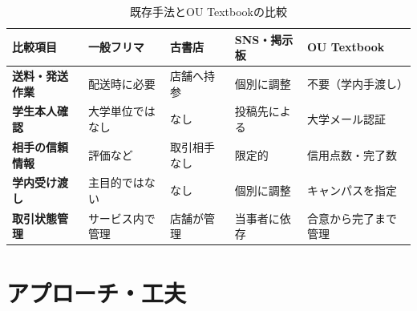 \documentclass[11pt,a4paper]{article}
\begin{document}
\begin{table}[htbp]
  \centering
  \caption{既存手法とOU Textbookの比較}
  \footnotesize
  \begin{tabularx}{\textwidth}{>{\bfseries}p{}XXXX}
    \toprule
    比較項目 & 一般フリマ & 古書店 & SNS・掲示板 & OU Textbook \\
    \midrule
    送料・発送作業
      & 配送時に必要
      & 店舗へ持参
      & 個別に調整
      & 不要（学内手渡し） \\
    学生本人確認
      & 大学単位ではなし
      & なし
      & 投稿先による
      & 大学メール認証 \\
    相手の信頼情報
      & 評価など
      & 取引相手なし
      & 限定的
      & 信用点数・完了数 \\
    学内受け渡し
      & 主目的ではない
      & なし
      & 個別に調整
      & キャンパスを指定 \\
    取引状態管理
      & サービス内で管理
      & 店舗が管理
      & 当事者に依存
      & 合意から完了まで管理 \\
    \bottomrule
  \end{tabularx}
\end{table}

\section{アプローチ・工夫}
\end{document}
